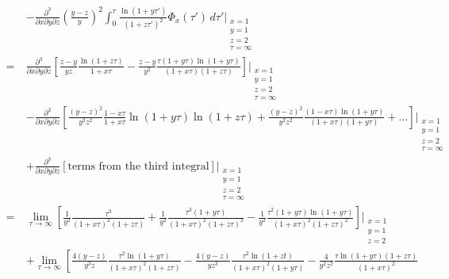 \documentclass[11pt]{article}
\begin{document}
\begin{align}
    \quad& -\frac{\partial^3}{\partial x \partial y \partial z} \left(\frac{y-z}{y}\right)^2 \int_0^{\tau} \frac{\ln(1+y\tau')}{(1+z\tau')^2} \Phi_x(\tau') \,d\tau'\Bigg\vert_{\substack{x=1 \\ y=1 \\ z=2 \\ \tau=\infty}} \\\nonumber
    =&{} \frac{\partial^3}{\partial x \partial y \partial  z} \left[\frac{z-y}{yz}\frac{\ln(1+z\tau)}{1+x\tau} - \frac{z-y}{y^2}\frac{\tau(1+y\tau)\ln(1+y\tau)}{(1+x\tau)(1+z\tau)}\right]\Bigg\vert_{\substack{x=1 \\ y=1 \\ z=2 \\ \tau=\infty}} \\\nonumber
    &- \frac{\partial^3}{\partial x \partial y \partial  z} \left[\frac{(y-z)^2}{y^2z^2}\frac{1-x\tau}{1+x\tau}\ln(1+y\tau)\ln(1+z\tau)
    + \frac{(y-z)^2}{y^2z^2}\frac{(1-x\tau)\ln(1+y\tau)}{(1+x\tau)(1+y\tau)} + ...\right]\Bigg\vert_{\substack{x=1 \\ y=1 \\ z=2 \\ \tau=\infty}} \\\nonumber
    &+ \frac{\partial^3}{\partial x \partial y \partial  z} \left[\textrm{terms from the third integral}\right]\Bigg\vert_{\substack{x=1 \\ y=1 \\ z=2 \\ \tau=\infty}} \\\nonumber
    =&{} \lim_{\tau\to\infty} \left[\frac{1}{y^2}\frac{\tau^3}{(1+x\tau)^2(1+z\tau)} + \frac{1}{y^2}\frac{\tau^3(1+y\tau)}{(1+x\tau)^2(1+z\tau)^2}
    - \frac{1}{y^2}\frac{\tau^2(1+y\tau)\ln(1+y\tau)}{(1+x\tau)^2(1+z\tau)^2}\right]\Bigg\vert_{\substack{x=1 \\ y=1 \\ z=2}} \\\nonumber
    &+ \lim_{\tau\to\infty} \left[
    \frac{4(y-z)}{y^3z}\frac{\tau^2\ln(1+y\tau)}{(1+x\tau)^2(1+z\tau)}
    -\frac{4(y-z)}{yz^3}\frac{\tau^2\ln(1+zt)}{(1+x\tau)^2(1+y\tau)}
    -\frac{4}{y^2z^2}\frac{\tau\ln(1+y\tau)(1+z\tau)}{(1+x\tau)^2} \right. \\\nonumber

\end{align}
\end{document}
